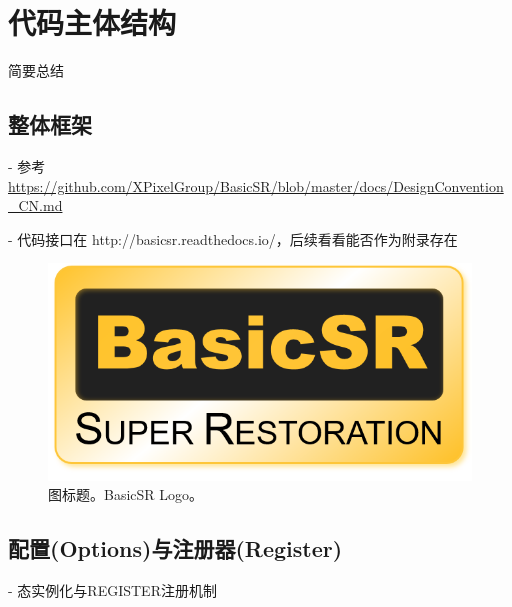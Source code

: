 \documentclass[../main.tex]{subfiles}
\begin{document}
\chapter{代码主体结构}
\vspace{-2cm}

简要总结

\section{整体框架}

- 参考 \url{https://github.com/XPixelGroup/BasicSR/blob/master/docs/DesignConvention_CN.md}

- 代码接口在 http://basicsr.readthedocs.io/，后续看看能否作为附录存在

\begin{figure}[t]
    \begin{center}
        \includegraphics[width=\linewidth]{figures/basicsr_logo.png}
        \vspace{-1cm}
        \caption{图标题。BasicSR Logo。}
        \label{fig:logo}
    \end{center}
\end{figure}

\section{配置(Options)与注册器(Register)}

- 态实例化与REGISTER注册机制
\end{document}
